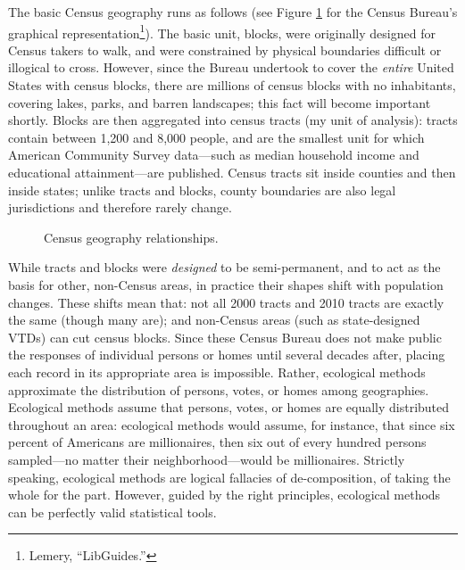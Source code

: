 \documentclass[
]{article}
\begin{document}
The basic Census geography runs as follows (see Figure \ref{fig:geography} for the Census Bureau's graphical representation\footnote{Lemery, ``LibGuides.''}).
The basic unit, blocks, were originally designed for Census takers to walk, and were constrained by physical boundaries difficult or illogical to cross.
However, since the Bureau undertook to cover the \emph{entire} United States with census blocks, there are millions of census blocks with no inhabitants, covering lakes, parks, and barren landscapes; this fact will become important shortly.
Blocks are then aggregated into census tracts (my unit of analysis): tracts contain between 1,200 and 8,000 people, and are the smallest unit for which American Community Survey data---such as median household income and educational attainment---are published.
Census tracts sit inside counties and then inside states; unlike tracts and blocks, county boundaries are also legal jurisdictions and therefore rarely change.

\begin{figure}

{\centering {}

}

\caption{Census geography relationships.}\label{fig:geography}
\end{figure}

While tracts and blocks were \emph{designed} to be semi-permanent, and to act as the basis for other, non-Census areas, in practice their shapes shift with population changes.
These shifts mean that: not all 2000 tracts and 2010 tracts are exactly the same (though many are); and non-Census areas (such as state-designed VTDs) can cut census blocks.
Since these Census Bureau does not make public the responses of individual persons or homes until several decades after, placing each record in its appropriate area is impossible.
Rather, ecological methods approximate the distribution of persons, votes, or homes among geographies.
Ecological methods assume that persons, votes, or homes are equally distributed throughout an area: ecological methods would assume, for instance, that since six percent of Americans are millionaires, then six out of every hundred persons sampled---no matter their neighborhood---would be millionaires.
Strictly speaking, ecological methods are logical fallacies of de-composition, of taking the whole for the part.
However, guided by the right principles, ecological methods can be perfectly valid statistical tools.
\end{document}
